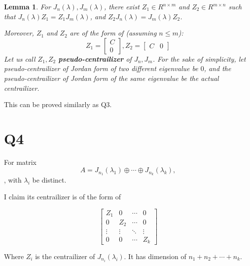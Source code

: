 \documentclass[12pt, a4paper]{article}
\newtheorem{lemma}[theorem]{Lemma}
\theoremstyle{definition}
\theoremstyle{remark}
\begin{document}
\begin{lemma}\label{CentrailizerForNonSquare}
	For $J_n(\lambda), J_m(\lambda)$, there exist $Z_1 \in R^{n\times m}$ and $Z_2 \in R^{m\times n}$ such that $J_n(\lambda) Z_1 = Z_1 J_m(\lambda)$, and $Z_2 J_n(\lambda) = J_m(\lambda) Z_2$.

	Moreover, $Z_1$ and $Z_2$ are of the form of (assuming $n \leq m$):
	$$
		Z_1 = \left[
			\begin{array}{c}
				C \\
				0
			\end{array}
			\right], Z_2=
		\left[
			\begin{array}{c|c}
				C & 0
			\end{array}
			\right]
	$$
	Let us call $Z_1, Z_2$ \textbf{pseudo-centrailizer} of $J_n, J_m$.
	For the sake of simplicity, let pseudo-centrailizer of Jordan form of two different eigenvalue be $0$, and the pseudo-centrailizer of Jordan form of the same eigenvalue be the actual centrailizer. 
\end{lemma}

This can be proved similarly as Q3.


\section{Q4}

For matrix $$A = J_{n_1}(\lambda_1)\oplus \cdots \oplus J_{n_k}(\lambda_k),$$, with $\lambda_i$ be distinct.

I claim its centrailizer is of the form of

\begin{equation}
	\left[
		\begin{array}{cccc}
			Z_1    & 0      & \cdots & 0      \\
			0      & Z_2    & \cdots & 0      \\
			\vdots & \vdots & \ddots & \vdots \\
			0      & 0      & \cdots & Z_k
		\end{array}
		\right]
\end{equation}

Where $Z_i$ is the centrailizer of $J_{n_i}(\lambda_i)$. It has dimension of $n_1 + n_2 + \cdots + n_k$.
\end{document}
